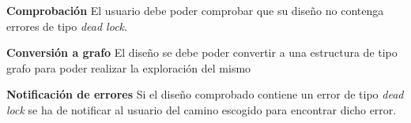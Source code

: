 	\item \textbf{Comprobación}\newline
		El usuario debe poder comprobar que su diseño no contenga errores de tipo \textit{dead lock}.
		\begin{functional}
			\item \textbf{Conversión a grafo}\newline
				El diseño se debe poder convertir a una estructura de tipo grafo para poder realizar la exploración del mismo
			\item \textbf{Notificación de errores}\newline
				Si el diseño comprobado contiene un error de tipo \textit{dead lock} se ha de notificar al usuario del camino
				escogido para encontrar dicho error.
		\end{functional}
